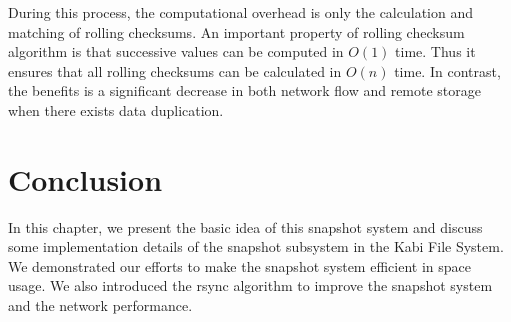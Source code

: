     During this process, the computational overhead is only the calculation and matching of rolling checksums. An important property of rolling checksum algorithm is that successive values can be computed in $O(1)$ time. Thus it ensures that all rolling checksums can be calculated in $O(n)$ time. In contrast, the benefits is a significant decrease in both network flow and remote storage when there exists data duplication.

\section{Conclusion}

   In this chapter, we present the basic idea of this snapshot system and discuss some implementation details of the snapshot subsystem in the Kabi File System. We demonstrated our efforts to make the snapshot system efficient in space usage. We also introduced the rsync algorithm to improve the snapshot system and the network performance.

